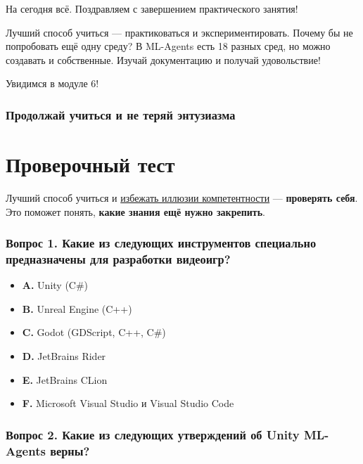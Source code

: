 \documentclass[11pt,a4paper]{article}
\begin{document}
На сегодня всё. Поздравляем с завершением практического занятия!

Лучший способ учиться --- практиковаться и экспериментировать. Почему бы не попробовать ещё одну среду? В ML-Agents есть 18 разных сред, но можно создавать и собственные. Изучай документацию и получай удовольствие!

Увидимся в модуле 6!

\subsubsection{Продолжай учиться и не теряй энтузиазма}\label{keep-learning-stay-awesome}

\section{Проверочный тест}\label{quiz}

Лучший способ учиться и \href{https://www.coursera.org/lecture/learning-how-to-learn/illusions-of-competence-BuFzf}{избежать иллюзии компетентности} --- \textbf{проверять себя}. Это поможет понять, \textbf{какие знания ещё нужно закрепить}.

\subsubsection{Вопрос 1. Какие из следующих инструментов специально предназначены для разработки видеоигр?}\label{q1-which-of-the-following-tools-are-specifically-designed-for-video-games-development}

\begin{itemize}
\tightlist
\item
  \textbf{A.} Unity (C\#)
\item
  \textbf{B.} Unreal Engine (C++)
\item
  \textbf{C.} Godot (GDScript, C++, C\#)
\item
  \textbf{D.} JetBrains Rider
\item
  \textbf{E.} JetBrains CLion
\item
  \textbf{F.} Microsoft Visual Studio и Visual Studio Code
\end{itemize}

\subsubsection{Вопрос 2. Какие из следующих утверждений об Unity ML-Agents верны?}\label{q2-what-of-the-following-statements-are-true-about-unity-ml-agents}
\end{document}
